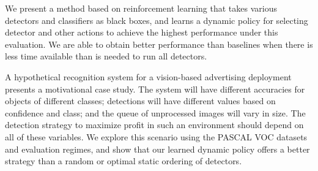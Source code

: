 We present a method based on reinforcement learning that takes various detectors and classifiers as black boxes, and learns a dynamic policy for selecting detector and other actions to achieve the highest performance under this evaluation.
We are able to obtain better performance than baselines when there is less time available than is needed to run all detectors.

A hypothetical recognition system for a vision-based advertising deployment presents a motivational case study.
The system will have different accuracies for objects of different classes; detections will have different values based on confidence and class; and the queue of unprocessed images will vary in size.
The detection strategy to maximize profit in such an environment should depend on all of these variables.
We explore this scenario using the PASCAL VOC datasets and evaluation regimes, and show that our learned dynamic policy offers a better strategy than a random or optimal static ordering of detectors.
